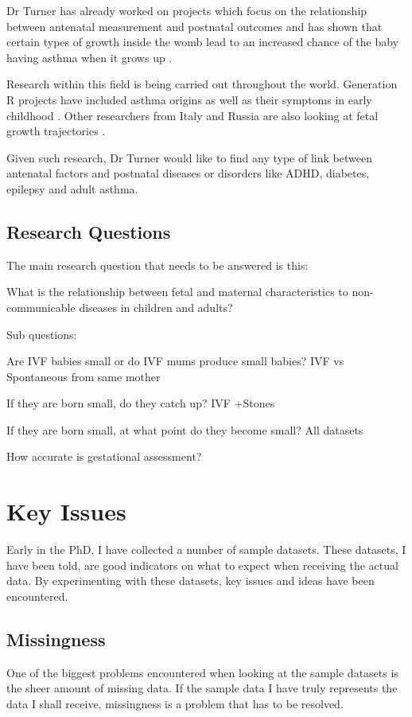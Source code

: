 \documentclass[bsc]{abdnthesis}
\begin{document}
Dr Turner has already worked on projects which focus on the relationship between antenatal measurement and postnatal outcomes and has shown that certain types of growth inside the womb lead to an increased chance of the baby having asthma when it grows up \cite{turner1}. 

Research within this field is being carried out throughout the world. Generation R projects have included asthma origins \cite{ generation-r} as well as their symptoms in early childhood \cite{ generation-r2}. Other researchers from Italy and Russia are also looking at fetal growth trajectories \cite{luccia1, luccia2, luccia3, luccia4}. 

Given such research, Dr Turner would like to find any type of link between antenatal factors and postnatal diseases or disorders like ADHD, diabetes, epilepsy and adult asthma. 

\section{Research Questions} %
\label{sec:research_questions}
The main research question that needs to be answered is this:

\centerline{What is the relationship between fetal and maternal characteristics to non-communicable diseases in children and adults?}

Sub questions:

Are IVF babies small or do IVF mums produce small babies? IVF vs Spontaneous from same mother

If they are born small, do they catch up? IVF +Stones​

If they are born small, at what point do they become small? All datasets

How accurate is gestational assessment? 


\chapter{Key Issues}
Early in the PhD, I have collected a number of sample datasets. These datasets, I have been told, are good indicators on what to expect when receiving the actual data. By experimenting with these datasets, key issues and ideas have been encountered. 

\section{Missingness} %
\label{sec:missingness}
One of the biggest problems encountered when looking at the sample datasets is the sheer amount of missing data. If the sample data I have truly represents the data I shall receive, missingness is a problem that has to be resolved. 
\end{document}
